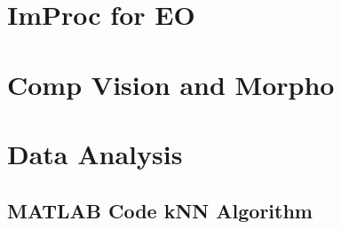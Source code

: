 \appendix
\section{ ImProc for EO}

\section{Comp Vision and Morpho}

\section{Data Analysis}

\subsection{MATLAB Code kNN Algorithm}
\label{apdx:kNN}
%

